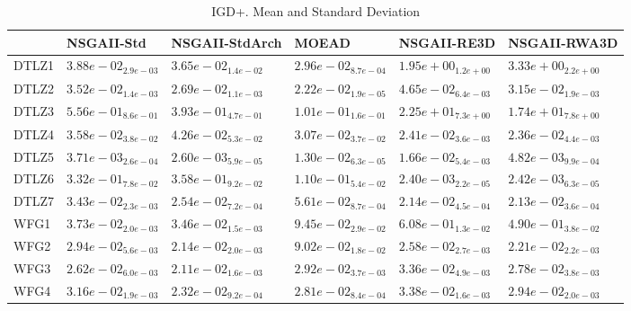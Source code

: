 \documentclass{article}
\begin{document}
\begin{table}
\caption{IGD+. Mean and Standard Deviation}
\label{table: IGD+}
\centering
\begin{scriptsize}
\begin{tabular}{llllll}
\hline & NSGAII-Std & NSGAII-StdArch & MOEAD & NSGAII-RE3D &  NSGAII-RWA3D\\
\hline 
DTLZ1 & $  3.88e-02_{ 2.9e-03}$ & \cellcolor{gray25}$  3.65e-02_{ 1.4e-02}$ & \cellcolor{gray95}$  2.96e-02_{ 8.7e-04}$ & $  1.95e+00_{ 1.2e+00}$ & $  3.33e+00_{ 2.2e+00}$ \\
DTLZ2 & $  3.52e-02_{ 1.4e-03}$ & \cellcolor{gray25}$  2.69e-02_{ 1.1e-03}$ & \cellcolor{gray95}$  2.22e-02_{ 1.9e-05}$ & $  4.65e-02_{ 6.4e-03}$ & $  3.15e-02_{ 1.9e-03}$ \\
DTLZ3 & $  5.56e-01_{ 8.6e-01}$ & \cellcolor{gray25}$  3.93e-01_{ 4.7e-01}$ & \cellcolor{gray95}$  1.01e-01_{ 1.6e-01}$ & $  2.25e+01_{ 7.3e+00}$ & $  1.74e+01_{ 7.8e+00}$ \\
DTLZ4 & $  3.58e-02_{ 3.8e-02}$ & $  4.26e-02_{ 5.3e-02}$ & $  3.07e-02_{ 3.7e-02}$ & \cellcolor{gray25}$  2.41e-02_{ 3.6e-03}$ & \cellcolor{gray95}$  2.36e-02_{ 4.4e-03}$ \\
DTLZ5 & \cellcolor{gray25}$  3.71e-03_{ 2.6e-04}$ & \cellcolor{gray95}$  2.60e-03_{ 5.9e-05}$ & $  1.30e-02_{ 6.3e-05}$ & $  1.66e-02_{ 5.4e-03}$ & $  4.82e-03_{ 9.9e-04}$ \\
DTLZ6 & $  3.32e-01_{ 7.8e-02}$ & $  3.58e-01_{ 9.2e-02}$ & $  1.10e-01_{ 5.4e-02}$ & \cellcolor{gray95}$  2.40e-03_{ 2.2e-05}$ & \cellcolor{gray25}$  2.42e-03_{ 6.3e-05}$ \\
DTLZ7 & $  3.43e-02_{ 2.3e-03}$ & $  2.54e-02_{ 7.2e-04}$ & $  5.61e-02_{ 8.7e-04}$ & \cellcolor{gray25}$  2.14e-02_{ 4.5e-04}$ & \cellcolor{gray95}$  2.13e-02_{ 3.6e-04}$ \\
WFG1 & \cellcolor{gray25}$  3.73e-02_{ 2.0e-03}$ & \cellcolor{gray95}$  3.46e-02_{ 1.5e-03}$ & $  9.45e-02_{ 2.9e-02}$ & $  6.08e-01_{ 1.3e-02}$ & $  4.90e-01_{ 3.8e-02}$ \\
WFG2 & $  2.94e-02_{ 5.6e-03}$ & \cellcolor{gray95}$  2.14e-02_{ 2.0e-03}$ & $  9.02e-02_{ 1.8e-02}$ & $  2.58e-02_{ 2.7e-03}$ & \cellcolor{gray25}$  2.21e-02_{ 2.2e-03}$ \\
WFG3 & \cellcolor{gray25}$  2.62e-02_{ 6.0e-03}$ & \cellcolor{gray95}$  2.11e-02_{ 1.6e-03}$ & $  2.92e-02_{ 3.7e-03}$ & $  3.36e-02_{ 4.9e-03}$ & $  2.78e-02_{ 3.8e-03}$ \\
WFG4 & $  3.16e-02_{ 1.9e-03}$ & \cellcolor{gray95}$  2.32e-02_{ 9.2e-04}$ & \cellcolor{gray25}$  2.81e-02_{ 8.4e-04}$ & $  3.38e-02_{ 1.6e-03}$ & $  2.94e-02_{ 2.0e-03}$ \\

\end{tabular}
\end{scriptsize}
\end{table}
\end{document}
